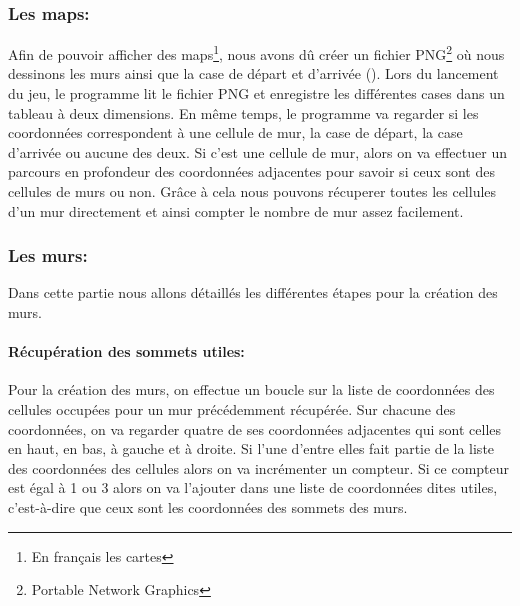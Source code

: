 \documentclass[12pt]{report}
\begin{document}
\subsubsection{Les maps:}
Afin de pouvoir afficher des maps\footnote{En français les cartes}, nous avons dû créer un fichier PNG\footnote{Portable Network Graphics} où nous dessinons les murs ainsi que la case de départ et d'arrivée (). Lors du lancement du jeu, le programme lit le fichier PNG et enregistre les différentes cases dans un tableau à deux dimensions. En même temps, le programme va regarder si les coordonnées correspondent à une cellule de mur, la case de départ, la case d'arrivée ou aucune des deux. Si c'est une cellule de mur, alors on va effectuer un parcours en profondeur des coordonnées adjacentes pour savoir si ceux sont des cellules de murs ou non. Grâce à cela nous pouvons récuperer toutes les cellules d'un mur directement et ainsi compter le nombre de mur assez facilement.
\subsubsection{Les murs:}

Dans cette partie nous allons détaillés les différentes étapes pour la création des murs.

\paragraph{Récupération des sommets utiles:}

Pour la création des murs, on effectue un boucle sur la liste de coordonnées des cellules occupées pour un mur précédemment récupérée. Sur chacune des coordonnées, on va regarder quatre de ses coordonnées adjacentes qui sont celles en haut, en bas, à gauche et à droite. Si l'une d'entre elles fait partie de la liste des coordonnées des cellules alors on va incrémenter un compteur. Si ce compteur est égal à 1 ou 3 alors on va l'ajouter dans une liste de coordonnées dites utiles, c'est-à-dire que ceux sont les coordonnées des sommets des murs.
\end{document}
